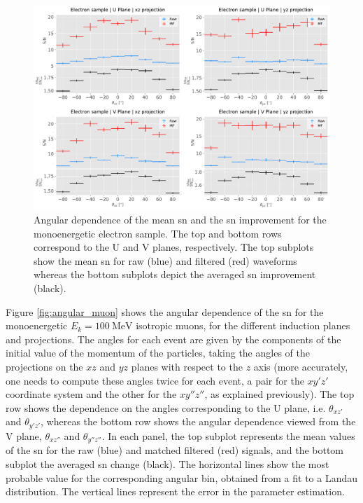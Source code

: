 \begin{figure}[t]
	\centering
	\includegraphics[width=0.9\linewidth]{Images/Matched_Filter/larsoft_electron_angular_alt.pdf}
	\caption[Angular dependence of the mean \gls{sn} and the \gls{sn} improvement for the monoenergetic electron sample.]{Angular dependence of the mean \gls{sn} and the \gls{sn} improvement for the monoenergetic electron sample. The top and bottom rows correspond to the U and V planes, respectively. The top subplots show the mean \gls{sn} for raw (blue) and filtered (red) waveforms whereas the bottom subplots depict the averaged \gls{sn} improvement (black).}
	\label{fig:angular_electron}
\end{figure}

Figure \ref{fig:angular_muon} shows the angular dependence of the \gls{sn} for the monoenergetic $E_{k}=100 \ \mathrm{MeV}$ isotropic muons, for the different induction planes and projections. The angles for each event are given by the components of the initial value of the momentum of the particles, taking the angles of the projections on the $xz$ and $yz$ planes with respect to the $z$ axis (more accurately, one needs to compute these angles twice for each event, a pair for the $xy'z'$ coordinate system and the other for the $xy''z''$, as explained previously). The top row shows the dependence on the angles corresponding to the U plane, i.e. $\theta_{xz'}$ and $\theta_{y'z'}$, whereas the bottom row shows the angular dependence viewed from the V plane, $\theta_{xz''}$ and $\theta_{y''z''}$. In each panel, the top subplot represents the mean values of the \gls{sn} for the raw (blue) and matched filtered (red) signals, and the bottom subplot the averaged \gls{sn} change (black). The horizontal lines show the most probable value for the corresponding angular bin, obtained from a fit to a Landau distribution. The vertical lines represent the error in the parameter estimation.

